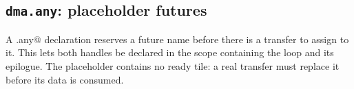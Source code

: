 \subsection*{\texttt{dma.any}: placeholder futures}

A \co@dma.any@ declaration reserves a future name before there is a transfer to assign to it. This lets both handles be declared in the scope containing the loop and its epilogue. The placeholder contains no ready tile: a real transfer must replace it before its data is consumed.

